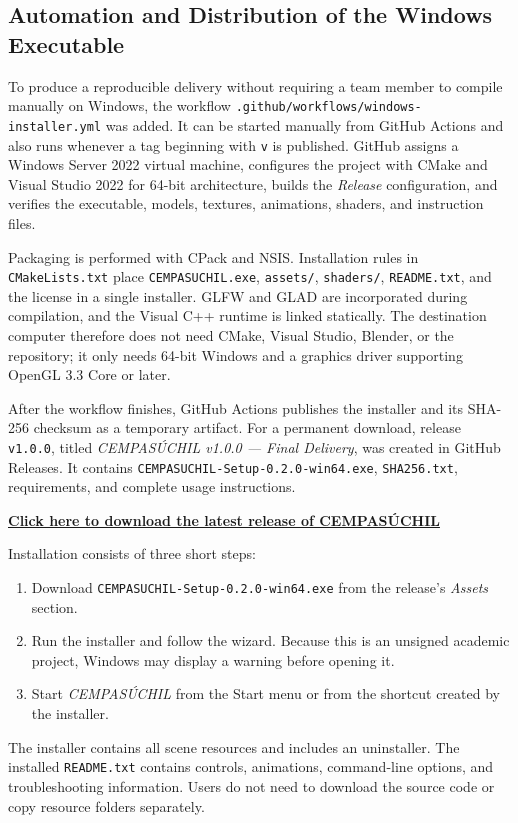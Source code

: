 \documentclass[letter,12pt]{article}
\begin{document}
	\subsection{Automation and Distribution of the Windows Executable}
	To produce a reproducible delivery without requiring a team member to compile manually on Windows, the workflow \texttt{.github/workflows/windows-installer.yml} was added. It can be started manually from GitHub Actions and also runs whenever a tag beginning with \texttt{v} is published. GitHub assigns a Windows Server 2022 virtual machine, configures the project with CMake and Visual Studio 2022 for 64-bit architecture, builds the \textit{Release} configuration, and verifies the executable, models, textures, animations, shaders, and instruction files.

	Packaging is performed with CPack and NSIS. Installation rules in \texttt{CMakeLists.txt} place \texttt{CEMPASUCHIL.exe}, \texttt{assets/}, \texttt{shaders/}, \texttt{README.txt}, and the license in a single installer. GLFW and GLAD are incorporated during compilation, and the Visual C++ runtime is linked statically. The destination computer therefore does not need CMake, Visual Studio, Blender, or the repository; it only needs 64-bit Windows and a graphics driver supporting OpenGL 3.3 Core or later.

	After the workflow finishes, GitHub Actions publishes the installer and its SHA-256 checksum as a temporary artifact. For a permanent download, release \texttt{v1.0.0}, titled \textit{CEMPASÚCHIL v1.0.0 --- Final Delivery}, was created in GitHub Releases. It contains \texttt{CEMPASUCHIL-Setup-0.2.0-win64.exe}, \texttt{SHA256.txt}, requirements, and complete usage instructions.

	\begin{center}
		\large
		\textbf{\href{https://github.com/olveratrech/proyecto-final-cempasuchil/releases/latest}{Click here to download the latest release of CEMPASÚCHIL}}
	\end{center}

	Installation consists of three short steps:
	\begin{enumerate}[leftmargin=*]
		\item Download \texttt{CEMPASUCHIL-Setup-0.2.0-win64.exe} from the release's \textit{Assets} section.
		\item Run the installer and follow the wizard. Because this is an unsigned academic project, Windows may display a warning before opening it.
		\item Start \textit{CEMPASÚCHIL} from the Start menu or from the shortcut created by the installer.
	\end{enumerate}
	The installer contains all scene resources and includes an uninstaller. The installed \texttt{README.txt} contains controls, animations, command-line options, and troubleshooting information. Users do not need to download the source code or copy resource folders separately.
\end{document}
